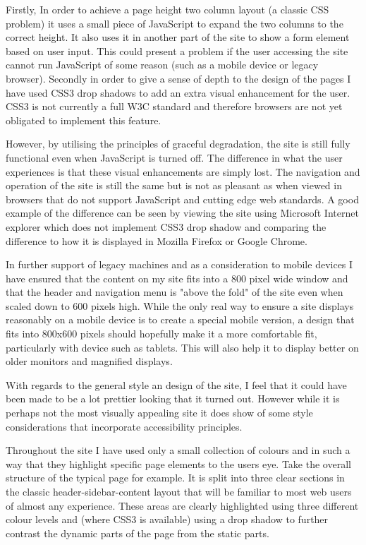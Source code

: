 \documentclass{article}
\begin{document}
Firstly, In order to achieve a page height two column layout (a classic CSS problem) it uses a small piece of JavaScript to expand the two columns to the correct height. It also uses it in another part of the site to show a form element based on user input. This could present a problem if the user accessing the site cannot run JavaScript of some reason (such as a mobile device or legacy browser). Secondly in order to give a sense of depth to the design of the pages I have used CSS3 drop shadows to add an extra visual enhancement for the user. CSS3 is not currently a full W3C standard and therefore browsers are not yet obligated to implement this feature.

However, by utilising the principles of graceful degradation, the site is still fully functional even when JavaScript is turned off. The difference in what the user experiences is that these visual enhancements are simply lost. The navigation and operation of the site is still the same but is not as pleasant as when viewed in browsers that do not support JavaScript and cutting edge web standards. A good example of the difference can be seen by viewing the site using Microsoft Internet explorer which does not implement CSS3 drop shadow and comparing the difference to how it is displayed in Mozilla Firefox or Google Chrome. 

In further support of legacy machines and as a consideration to mobile devices I have ensured that the content on my site fits into a 800 pixel wide window and that the header and navigation menu is "above the fold" of the site even when scaled down to 600 pixels high. While the only real way to ensure a site displays reasonably on a mobile device is to create a special mobile version, a design that fits into 800x600 pixels should hopefully make it a more comfortable fit, particularly with device such as tablets. This will also help it to display better on older monitors and magnified displays.

With regards to the general style an design of the site, I feel that it could have been made to be a lot prettier looking that it turned out. However while it is perhaps not the most visually appealing site it does show of some style considerations that incorporate accessibility principles.

Throughout the site I have used only a small collection of colours and in such a way that they highlight specific page elements to the users eye. Take the overall structure of the typical page for example. It is split into three clear sections in the classic header-sidebar-content layout that will be familiar to most web users of almost any experience. These areas are clearly highlighted using three different colour levels and (where CSS3 is available) using a drop shadow to further contrast the dynamic parts of the page from the static parts.
\end{document}
